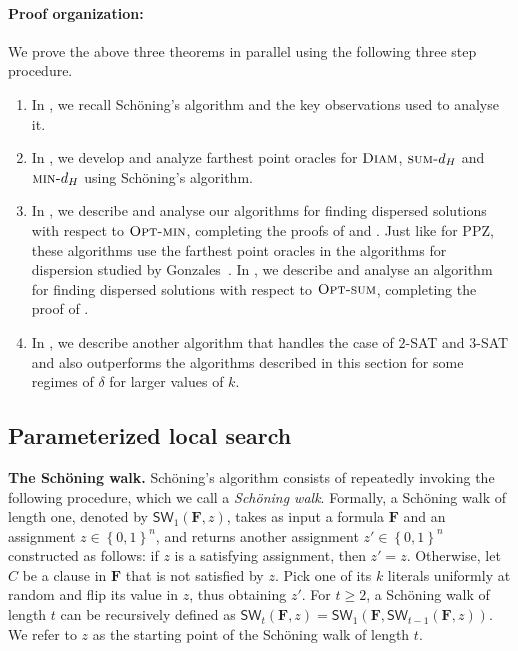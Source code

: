 \documentclass[11pt, letterpaper]{article}
\theoremstyle{definition}
\newcommand{\set}[1]{\left \{ #1 \right \}}
\newcommand{\f}{\mathbf{F}}
\newcommand{\SW}{\textsf{SW}}
\newcommand{\sumd}{\textsc{sum-}d_H}
\newcommand{\mind}{\textsc{min-}d_H}
\newcommand{\opts}{\textsc{Opt-sum}}
\newcommand{\optm}{\textsc{Opt-min}}
\newcommand{\D}{\textsc{Diam}}
\newcommand{\sch}{Sch\"{o}ning\xspace}
\begin{document}
\paragraph{Proof organization:} We prove the above three theorems in parallel using the following three step procedure. 
\begin{enumerate}
    \item In , we recall \sch's algorithm and the key observations used to analyse it. 
    \item In , we develop and analyze farthest point oracles for $\D$, $\sumd$ and $\mind$ using \sch's algorithm.
    \item In , we describe and analyse our algorithms for finding dispersed solutions with respect to $\optm$, completing the proofs of  and . Just like for PPZ, these algorithms use the farthest point oracles in the algorithms for dispersion studied by Gonzales~\cite{gonzalez1985clustering}. In , we describe and analyse an algorithm for finding dispersed solutions with respect to $\opts$, completing the proof of . 
    \item In , we describe another algorithm that handles the case of $2$-SAT and $3$-SAT and also outperforms the algorithms described in this section for some regimes of $\delta$ for larger values of $k$.
\end{enumerate}

\subsection{Parameterized local search} \label{sec:schprelims}
\textbf{The Sch\"oning walk.} Sch\"oning's algorithm consists of repeatedly invoking the following procedure, which we call a \emph{Sch\"oning walk}. Formally, a Sch\"oning walk of length one, denoted by $\SW_1(\f,z)$, takes as input a formula $\f$ and an assignment $z\in\set{0,1}^n$, and returns another assignment $z'\in\set{0,1}^n$ constructed as follows: if $z$ is a satisfying assignment, then $z'=z$. Otherwise, let $C$ be a clause in $\f$ that is not satisfied by $z$. Pick one of its $k$ literals uniformly at random and flip its value in $z$, thus obtaining $z'$. For $t\geq 2$, a Sch\"oning walk of length $t$ can be recursively defined as $\SW_t(\f,z) = \SW_1(\f, 
\SW_{t-1}(\f,z))$. We refer to $z$ as the starting point of the Sch\"oning walk of length $t$. 
\end{document}

